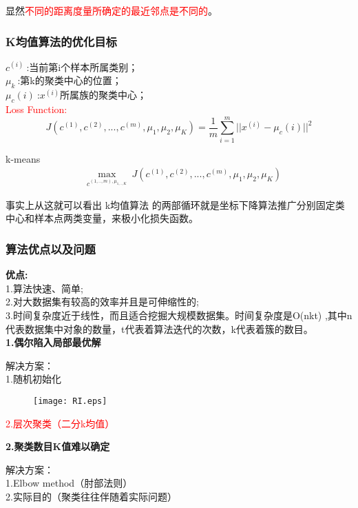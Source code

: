 显然\textcolor{red}{不同的距离度量所确定的最近邻点是不同的}。


\subsubsection{K均值算法的优化目标}
\noindent
$c^{(i)}~$:当前第i个样本所属类别；\\
$\mu_k~$:第k的聚类中心的位置；\\
$\mu_c(i)~$:$x^{(i)}$所属族的聚类中心；\\
\textcolor{red}{Loss Function:}\\
$$J(c^{(1)},c^{(2)},...,c^{(m)},\mu_1,\mu_2,\mu_K)=\frac{1}{m}\sum_{i=1}^{m}||x^{(i)}-\mu_c(i)||^2$$

k-means
\begin{align}
            &\max \limits_{c^{(1,..,m),\mu_{1,..,K}}}~J(c^{(1)},c^{(2)},...,c^{(m)},\mu_1,\mu_2,\mu_K)  \nonumber
\end{align}

事实上从这就可以看出 k均值算法 的两部循环就是坐标下降算法推广分别固定类中心和样本点两类变量，来极小化损失函数。

\subsubsection{算法优点以及问题}
\noindent \textbf{优点:}\\
\indent 1.算法快速、简单;\\
\indent 2.对大数据集有较高的效率并且是可伸缩性的;\\
\indent 3.时间复杂度近于线性，而且适合挖掘大规模数据集。时间复杂度是O(nkt) ,其中n代表数据集中对象的数量，t代表着算法迭代的次数，k代表着簇的数目。\\


\noindent\textbf{1.偶尔陷入局部最优解}

解决方案：\\
\indent 1.随机初始化
\begin{figure}[!ht]
  \centering
  \texttt{[image: RI.eps]}
\end{figure}

\textcolor{red}{2.层次聚类（二分k均值）}


\noindent\textbf{2.聚类数目K值难以确定}

解决方案：\\
\indent 1.Elbow method（肘部法则）  \\
\indent 2.实际目的（聚类往往伴随着实际问题）


